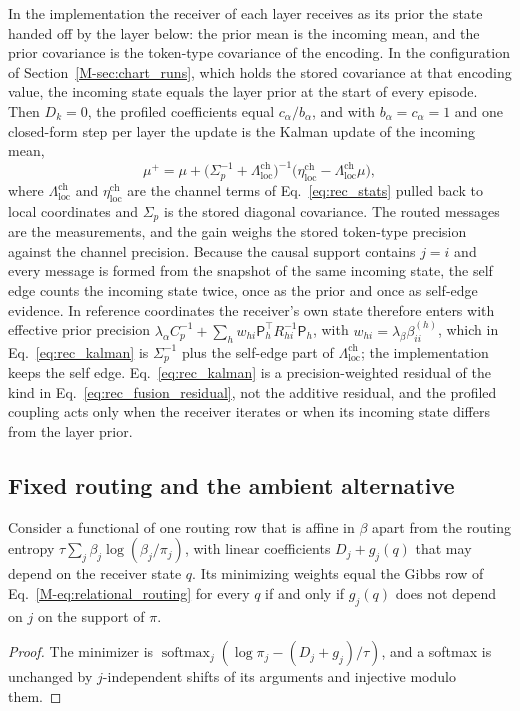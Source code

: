 \documentclass[twoside,11pt]{article}
\newcommand{\softmax}{\operatorname{softmax}}
\begin{document}
In the implementation the receiver of each layer receives as its prior the state handed off by the layer below: the prior mean is the incoming mean, and the prior covariance is the token-type covariance of the encoding. In the configuration of Section~\ref{M-sec:chart_runs}, which holds the stored covariance at that encoding value, the incoming state equals the layer prior at the start of every episode. Then $D_k=0$, the profiled coefficients equal $c_\alpha/b_\alpha$, and with $b_\alpha=c_\alpha=1$ and one closed-form step per layer the update is the Kalman update of the incoming mean,
\begin{equation}
\mu^+=\mu+\bigl(\Sigma_p^{-1}+\Lambda^{\mathrm{ch}}_{\mathrm{loc}}\bigr)^{-1}\bigl(\eta^{\mathrm{ch}}_{\mathrm{loc}}-\Lambda^{\mathrm{ch}}_{\mathrm{loc}}\mu\bigr),
\label{eq:rec_kalman}
\end{equation}
where $\Lambda^{\mathrm{ch}}_{\mathrm{loc}}$ and $\eta^{\mathrm{ch}}_{\mathrm{loc}}$ are the channel terms of Eq.~\eqref{eq:rec_stats} pulled back to local coordinates and $\Sigma_p$ is the stored diagonal covariance. The routed messages are the measurements, and the gain weighs the stored token-type precision against the channel precision. Because the causal support contains $j=i$ and every message is formed from the snapshot of the same incoming state, the self edge counts the incoming state twice, once as the prior and once as self-edge evidence. In reference coordinates the receiver's own state therefore enters with effective prior precision $\lambda_\alpha C_p^{-1}+\sum_hw_{hi}\mathsf P_h^\top R_{hi}^{-1}\mathsf P_h$, with $w_{hi}=\lambda_\beta\beta_{ii}^{(h)}$, which in Eq.~\eqref{eq:rec_kalman} is $\Sigma_p^{-1}$ plus the self-edge part of $\Lambda^{\mathrm{ch}}_{\mathrm{loc}}$; the implementation keeps the self edge. Eq.~\eqref{eq:rec_kalman} is a precision-weighted residual of the kind in Eq.~\eqref{eq:rec_fusion_residual}, not the additive residual, and the profiled coupling acts only when the receiver iterates or when its incoming state differs from the layer prior.

\subsection{Fixed routing and the ambient alternative}
\label{sec:rec_fixed_routing}

\begin{proposition}
\label{prop:rec_no_joint}
Consider a functional of one routing row that is affine in $\beta$ apart from the routing entropy $\tau\sum_j\beta_j\log(\beta_j/\pi_j)$, with linear coefficients $D_j+g_j(q)$ that may depend on the receiver state $q$. Its minimizing weights equal the Gibbs row of Eq.~\eqref{M-eq:relational_routing} for every $q$ if and only if $g_j(q)$ does not depend on $j$ on the support of $\pi$.
\end{proposition}
\begin{proof}
The minimizer is $\softmax_j(\log\pi_j-(D_j+g_j)/\tau)$, and a softmax is unchanged by $j$-independent shifts of its arguments and injective modulo them.
\end{proof}
\end{document}

